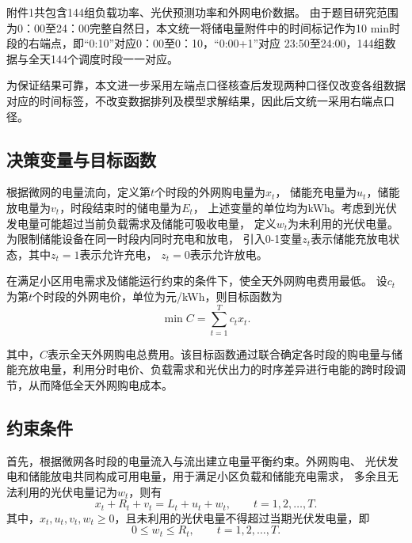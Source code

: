 附件1共包含144组负载功率、光伏预测功率和外网电价数据。
由于题目研究范围为0：00至24：00完整自然日，本文统一将储电量附件中的时间标记作为10 min时段的右端点，即“0:10”对应0：00至0：10，“0:00+1”对应 23{:}50至24{:}00，144组数据与全天144个调度时段一一对应。

为保证结果可靠，本文进一步采用左端点口径核查后发现两种口径仅改变各组数据对应的时间标签，不改变数据排列及模型求解结果，因此后文统一采用右端点口径。




\subsection{决策变量与目标函数}

根据微网的电量流向，定义第$t$个时段的外网购电量为$x_t$，
储能充电量为$u_t$，储能放电量为$v_t$，时段结束时的储电量为$E_t$，
上述变量的单位均为kWh。考虑到光伏发电量可能超过当前负载需求及储能可吸收电量，
定义$w_t$为未利用的光伏电量。为限制储能设备在同一时段内同时充电和放电，
引入0-1变量$z_t$表示储能充放电状态，其中$z_t=1$表示允许充电，
$z_t=0$表示允许放电。

在满足小区用电需求及储能运行约束的条件下，使全天外网购电费用最低。
设$c_t$为第$t$个时段的外网电价，单位为元/kWh，则目标函数为
\begin{equation}
\min C=\sum_{t=1}^{T}c_t x_t .
\label{eq:objective_p1}
\end{equation}

其中，$C$表示全天外网购电总费用。该目标函数通过联合确定各时段的购电量与储能充放电量，利用分时电价、负载需求和光伏出力的时序差异进行电能的跨时段调节，从而降低全天外网购电成本。




\subsection{约束条件}

首先，根据微网各时段的电量流入与流出建立电量平衡约束。外网购电、
光伏发电和储能放电共同构成可用电量，用于满足小区负载和储能充电需求，
多余且无法利用的光伏电量记为$w_t$，则有
\begin{equation}
x_t+R_t+v_t=L_t+u_t+w_t,
\qquad t=1,2,\ldots,T.
\label{eq:energy_balance}
\end{equation}
其中，$x_t,u_t,v_t,w_t\geq0$，且未利用的光伏电量不得超过当期光伏发电量，即
\begin{equation}
0\leq w_t\leq R_t,
\qquad t=1,2,\ldots,T.
\label{eq:curtailment}
\end{equation}

